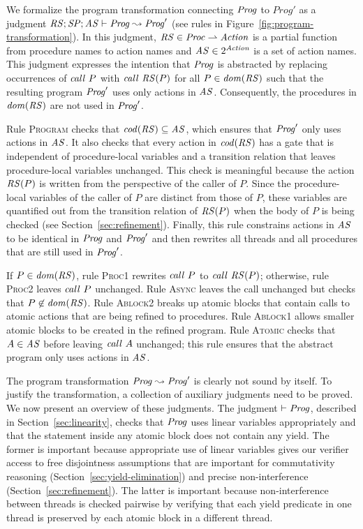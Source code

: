 We formalize the program transformation connecting $\mathit{Prog}$ to $Prog'$ as a judgment
$\mathit{RS};\mathit{SP};\mathit{AS} \vdash \mathit{Prog} \leadsto \mathit{Prog}'$ (see rules in Figure~\ref{fig:program-transformation}).
In this judgment,
$\mathit{RS} \in \mathit{Proc} \rightharpoonup \mathit{Action}$ is a partial function from procedure names to action names
and $\mathit{AS} \in 2^{\mathit{Action}}$ is a set of action names.
This judgment expresses the intention that $\mathit{Prog}$ is abstracted by replacing
occurrences of $\mathit{call}\ P$ with $\mathit{call}\ \mathit{RS}(P)$ for all $P \in \mathit{dom}(\mathit{RS})$ such that 
the resulting program $\mathit{Prog}'$ uses only actions in $\mathit{AS}$.
Consequently, the procedures in $\mathit{dom}(\mathit{RS})$ are not used in $\mathit{Prog}'$.

Rule \textsc{Program} checks that $\mathit{cod}(\mathit{RS}) \subseteq \mathit{AS}$,
which ensures that $\mathit{Prog}'$ only uses actions in $\mathit{AS}$.
It also checks that every action in $\mathit{cod}(\mathit{RS})$ has a gate 
that is independent of procedure-local variables and a transition relation that leaves 
procedure-local variables unchanged.  
This check is meaningful because the action $\mathit{RS}(P)$ is written from the 
perspective of the caller of $P$.
Since the procedure-local variables of the caller of $P$ are distinct from those of $P$,
these variables are quantified out from the transition relation of $\mathit{RS}(P)$ when 
the body of $P$ is being checked (see Section~\ref{sec:refinement}).
Finally, this rule constrains actions in $\mathit{AS}$ to be identical in $\mathit{Prog}$ and $\mathit{Prog}'$ and then rewrites all threads
and all procedures that are still used in $\mathit{Prog}'$.

If $P \in \mathit{dom}(\mathit{RS})$, rule \textsc{Proc1} rewrites $\mathit{call}\ P$ to $\mathit{call}\ \mathit{RS}(P)$;
otherwise, rule \textsc{Proc2} leaves $\mathit{call}\ P$ unchanged.
Rule \textsc{Async} leaves the call unchanged but checks that $P \not \in \mathit{dom}(\mathit{RS})$.
Rule \textsc{Ablock2} breaks up atomic blocks that contain calls
to atomic actions that are being refined to procedures.
Rule \textsc{Ablock1} allows smaller atomic blocks to be created in the refined program.
Rule \textsc{Atomic} checks that $A \in \mathit{AS}$ before leaving $\mathit{call}\ A$ unchanged;
this rule ensures that the abstract program only uses actions in $\mathit{AS}$.

The program transformation $\mathit{Prog} \leadsto \mathit{Prog}'$ is clearly not sound by itself.
To justify the transformation, a collection of auxiliary judgments need to be proved.
We now present an overview of these judgments.
The judgment $\vdash \mathit{Prog}$, described in Section~\ref{sec:linearity}, 
checks that $\mathit{Prog}$ uses linear variables appropriately and that the statement
inside any atomic block does not contain any yield.
The former is important because appropriate use of linear variables gives our verifier access to free disjointness
assumptions that are important for commutativity reasoning (Section~\ref{sec:yield-elimination})
and precise non-interference (Section~\ref{sec:refinement}).
The latter is important because non-interference between threads is checked pairwise by verifying that each yield predicate
in one thread is preserved by each atomic block in a different thread.

